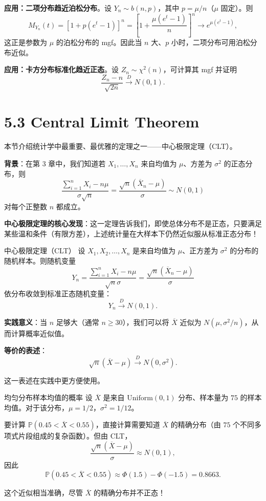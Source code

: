 \textbf{应用：二项分布趋近泊松分布}。设 $Y_n \sim b(n,p)$，其中 $p = \mu/n$（$\mu$ 固定）。则
\[
M_{Y_n}(t) = [1 + p(e^t - 1)]^n = \left[1 + \frac{\mu(e^t - 1)}{n}\right]^n \to e^{\mu(e^t - 1)},
\]
这正是参数为 $\mu$ 的泊松分布的 mgf。因此当 $n$ 大、$p$ 小时，二项分布可用泊松分布近似。%

\textbf{应用：卡方分布标准化趋近正态}。设 $Z_n \sim \chi^2(n)$，可计算其 mgf 并证明
\[
\frac{Z_n - n}{\sqrt{2n}} \xrightarrow{D} N(0,1).
\label{eq:chi-square-to-normal}
\]

\section{5.3 Central Limit Theorem}\label{sec:5.3}

本节介绍统计学中最重要、最优雅的定理之一——中心极限定理（CLT）。

\textbf{背景}：在第 3 章中，我们知道若 $X_1, \ldots, X_n$ 来自均值为 $\mu$、方差为 $\sigma^2$ 的正态分布，则
\[
\frac{\sum_{i=1}^n X_i - n\mu}{\sigma\sqrt{n}} = \frac{\sqrt{n}(\overline{X}_n - \mu)}{\sigma} \sim N(0,1)
\]
对每个正整数 $n$ 都成立。

\textbf{中心极限定理的核心发现}：这一定理告诉我们，即使总体分布不是正态，只要满足某些温和条件（有限方差），上述统计量在大样本下仍然近似服从标准正态分布！

\begin{theorem}{中心极限定理（CLT）}\label{th:clt}
设 $X_1, X_2, \ldots, X_n$ 是来自均值为 $\mu$、正方差为 $\sigma^2$ 的分布的随机样本。则随机变量
\[
Y_n = \frac{\sum_{i=1}^n X_i - n\mu}{\sqrt{n}\sigma} = \frac{\sqrt{n}(\overline{X}_n - \mu)}{\sigma}
\]
依分布收敛到标准正态随机变量：
\[
Y_n \xrightarrow{D} N(0,1).
\label{eq:clt-statement}
\]
\end{theorem}

\textbf{实践意义}：当 $n$ 足够大（通常 $n \geq 30$），我们可以将 $\overline{X}$ 近似为 $N(\mu, \sigma^2/n)$，从而计算概率近似值。%

\textbf{等价的表述}：
\[
\sqrt{n}(\overline{X} - \mu) \xrightarrow{D} N(0, \sigma^2).
\label{eq:clt-alternative}
\]

这一表述在实践中更方便使用。

\begin{example}{均匀分布样本均值的概率}\label{ex:uniform-sample-mean}
设 $\overline{X}$ 是来自 $\mathrm{Uniform}(0,1)$ 分布、样本量为 $75$ 的样本均值。对于该分布，$\mu = 1/2$，$\sigma^2 = 1/12$。

要计算 $\mathbb{P}(0.45 < \overline{X} < 0.55)$，直接计算需要知道 $\overline{X}$ 的精确分布（由 $75$ 个不同多项式片段组成的复杂函数）。但由 CLT，
\[
\frac{\sqrt{n}(\overline{X} - \mu)}{\sigma} \approx N(0,1),
\]
因此
\[
\mathbb{P}(0.45 < \overline{X} < 0.55) \approx \Phi(1.5) - \Phi(-1.5) = 0.8663.
\label{eq:uniform-clt-approx}
\]

这个近似相当准确，尽管 $\overline{X}$ 的精确分布并不正态！%
\end{example}

